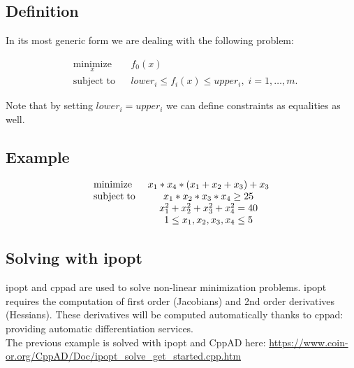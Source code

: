 \documentclass[11pt]{article}
\begin{document}
\subsection{Definition}

In its most generic form we are dealing with the following problem:

\begin{equation*}
\begin{aligned}
& \underset{x}{\text{minimize}}
& & f_0(x) \\
& \text{subject to}
& & lower_i \leq f_i(x) \leq upper_i, \; i = 1, \ldots, m.
\end{aligned}
\end{equation*}

Note that by setting $lower_i = upper_i $ we can define constraints as equalities as well.

\subsection{Example}

\begin{equation*}
\begin{array}{lc}
{\rm minimize \; }      &  x_1 * x_4 * (x_1 + x_2 + x_3) + x_3 \\
{\rm subject \; to \; } &  x_1 * x_2 * x_3 * x_4  \geq 25 \\
                        &  x_1^2 + x_2^2 + x_3^2 + x_4^2 = 40 \\
                        &  1 \leq x_1, x_2, x_3, x_4 \leq 5
\end{array}
\end{equation*}

\subsection{Solving with ipopt}

ipopt and cppad are used to solve non-linear minimization problems.
ipopt requires the computation of first order (Jacobians) and 2nd order derivatives (Hessians).
These derivatives will be computed automatically thanks to cppad: providing automatic differentiation services. \\
The previous example is solved with ipopt and CppAD here:
\url{https://www.coin-or.org/CppAD/Doc/ipopt_solve_get_started.cpp.htm}
\end{document}
